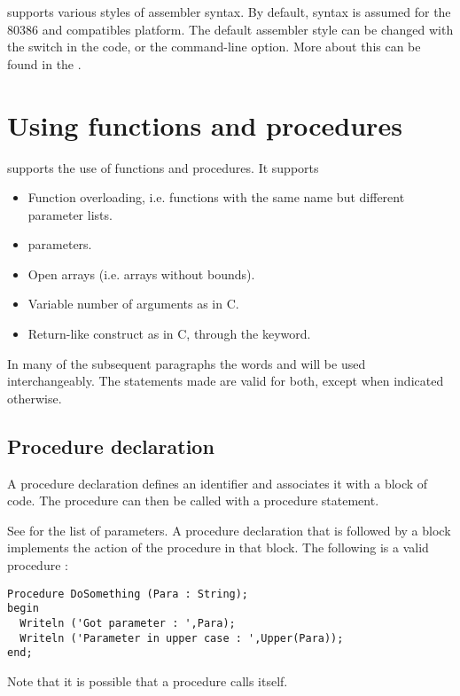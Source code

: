 \fpc supports various styles of assembler syntax. By default, 
syntax is assumed for the 80386 and compatibles platform.
The default assembler style can be changed with the 
switch in the code, or the  command-line option. More about this can
be found in the \progref.


\chapter{Using functions and procedures}
\label{ch:Procedures}
\fpc supports the use of functions and procedures. It supports
\begin{itemize}
\item Function overloading, i.e. functions with the same name but different
parameter lists.
\item {} parameters.
\item Open arrays (i.e. arrays without bounds).
\item Variable number of arguments as in C.
\item Return-like construct as in C, through the  keyword.
\end{itemize}

\begin{remark} In many of the subsequent paragraphs the words 
and  will be used interchangeably. The statements made are
valid for both, except when indicated otherwise.
\end{remark}

\section{Procedure declaration}
A procedure declaration defines an identifier and associates it with a
block of code. The procedure can then be called with a procedure statement.

See  for the list of parameters.
A procedure declaration that is followed by a block implements the action of
the procedure in that block.
The following is a valid procedure :
\begin{verbatim}
Procedure DoSomething (Para : String);
begin
  Writeln ('Got parameter : ',Para);
  Writeln ('Parameter in upper case : ',Upper(Para));
end;
\end{verbatim}
Note that it is possible that a procedure calls itself.

